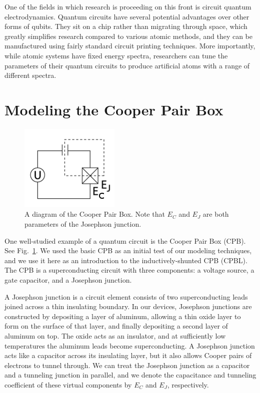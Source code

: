 \documentclass[twocolumn]{revtex4}
\newcommand{\picwidth}{0.66\linewidth}
\begin{document}
One of the fields in which research is proceeding on this front is
circuit quantum electrodynamics. Quantum circuits have several
potential advantages over other forms of qubits. They sit on a chip
rather than migrating through space, which greatly simplifies research
compared to various atomic methods, and they can be manufactured using
fairly standard circuit printing techniques. More importantly, while
atomic systems have fixed energy spectra, researchers can tune the
parameters of their quantum circuits to produce artificial atoms with
a range of different spectra.

\section{Modeling the Cooper Pair Box}

\begin{figure}
  \includegraphics[width=\picwidth]{CPB-circuit.png}
  \caption{A diagram of the Cooper Pair Box. Note that $E_C$ and $E_J$
    are both parameters of the Josephson junction.}
  \label{cpb-circuit}
\end{figure}

One well-studied example of a quantum circuit is the Cooper Pair Box
(CPB). See Fig.\ \ref{cpb-circuit}. We used the basic CPB as an initial
test of our modeling techniques, and we use it here as an introduction
to the inductively-shunted CPB (CPBL). The CPB is a superconducting
circuit with three components: a voltage source, a gate capacitor, and
a Josephson junction.

%
%

A Josephson junction is a circuit element consists of two
superconducting leads joined across a thin insulating boundary. In our
devices, Josephson junctions are constructed by depositing a layer of
aluminum, allowing a thin oxide layer to form on the surface of that
layer, and finally depositing a second layer of aluminum on top. The
oxide acts as an insulator, and at sufficiently low temperatures the
aluminum leads become superconducting. A Josephson junction acts like
a capacitor across its insulating layer, but it also allows Cooper
pairs of electrons to tunnel through. We can treat the Josephson
junction as a capacitor and a tunneling junction in parallel, and we
denote the capacitance and tunneling coefficient of these virtual
components by $E_C$ and $E_J$, respectively.
\end{document}
